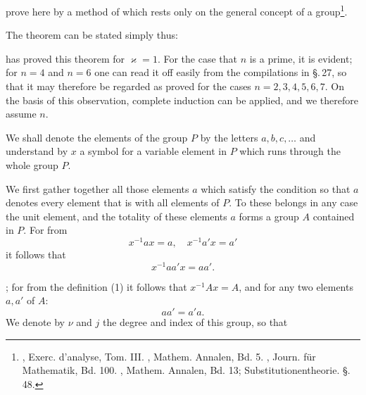 prove here by a method of  which rests only on the general concept of a group\footnote{, Exerc. d'analyse, Tom. III. , Mathem. Annalen, Bd. 5. , Journ. für Mathematik, Bd. 100. , Mathem. Annalen, Bd. 13; Substitutionentheorie. \S.\,48.}.

The theorem can be stated simply thus:


 has proved this theorem for $\varkappa = 1$. For the case that $n$ is a prime, it is evident; for $n = 4$ and $n = 6$ one can read it off easily from the compilations in \S.\,27, so that it may therefore be regarded as proved for the cases $n = 2, 3, 4, 5, 6, 7$. On the basis of this observation, complete induction can be applied, and we therefore assume  $n$.

We shall denote the elements of the group $P$ by the letters $a, b, c, \ldots$ and understand by $x$ a symbol for a variable element in $P$ which runs through the whole group $P$.

We first gather together all those elements $a$ which satisfy the condition
so that $a$ denotes every element that is  with all elements of $P$. To these belongs in any case the unit element, and the totality of these elements $a$ forms a group $A$ contained in $P$. For from
\[ x^{-1}ax = a,\quad x^{-1}a'x = a' \]
it follows that
\[ x^{-1}aa'x = aa'. \]

; for from the definition (1) it follows that $x^{-1}Ax = A$, and for any two elements $a, a'$ of $A$:
\[ aa' = a'a. \]
We denote by $\nu$ and $j$ the degree and index of this group, so that
